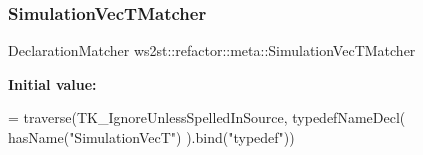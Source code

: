 \subsubsection{\texorpdfstring{Simulation\+Vec\+T\+Matcher}{SimulationVecTMatcher}}
{\footnotesize\ttfamily Declaration\+Matcher ws2st\+::refactor\+::meta\+::\+Simulation\+Vec\+T\+Matcher}

{\bfseries Initial value\+:}
\begin{DoxyCode}
= traverse(TK\_IgnoreUnlessSpelledInSource, typedefNameDecl(
        hasName(\textcolor{stringliteral}{"SimulationVecT"})
    ).bind(\textcolor{stringliteral}{"typedef"}))
\end{DoxyCode}
